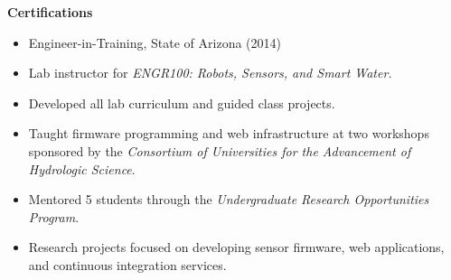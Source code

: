 \textcolor{heading}{\textbf{Certifications}}

\vspace{6pt}

\begin{itemize}
\item Engineer-in-Training, State of Arizona (2014) 
\end{itemize}







\begin{itemize}
\item Lab instructor for \textit{ENGR100: Robots, Sensors, and Smart Water.}
\item Developed all lab curriculum and guided class projects.
\end{itemize}

\divider


\begin{itemize}
\item Taught firmware programming and web infrastructure at two workshops sponsored
  by the \textit{Consortium of Universities for the Advancement of Hydrologic Science}.
\end{itemize}

\divider


\begin{itemize}
\item Mentored 5 students through the \textit{Undergraduate Research
    Opportunities Program}.
\item Research projects focused on developing sensor firmware, web applications,
  and continuous integration services.
\end{itemize}
